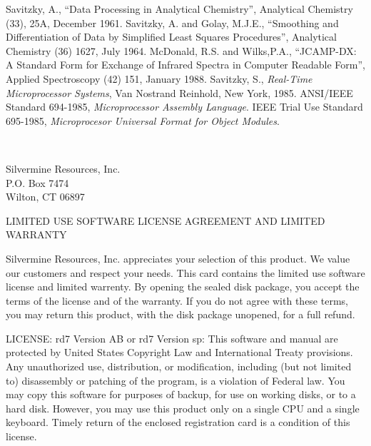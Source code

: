 {\small
\begin{thebibliography}{9}
	Savitzky, A., ``Data Processing in Analytical Chemistry'',
	Analytical Chemistry (33), 25A, December 1961.
	Savitzky, A. and Golay, M.J.E., ``Smoothing and Differentiation
	of Data by Simplified Least Squares Procedures'', Analytical
	Chemistry (36) 1627, July 1964.
	McDonald, R.S. and Wilks,P.A., ``JCAMP-DX: A Standard Form for
	Exchange of Infrared Spectra in Computer Readable Form'', 
	Applied Spectroscopy (42) 151, January 1988.
	Savitzky, S., {\em Real-Time Microprocessor Systems},
	Van Nostrand Reinhold, New York, 1985.
	ANSI/IEEE Standard 694-1985, {\em Microprocessor
	Assembly Language}.
	IEEE Trial Use Standard 695-1985, {\em Microprocesor Universal
	Format for Object Modules}.
\end{thebibliography}
}
\medskip
\noindent\ \hrulefill\ 
\begin{center}
	Silvermine Resources, Inc.	\\
	P.O. Box 7474			\\
	Wilton, CT 06897		\\
\end{center}

 
\newpage
\begin{center}
     LIMITED USE SOFTWARE LICENSE AGREEMENT AND LIMITED WARRANTY
\end{center}

Silvermine Resources, Inc. appreciates your selection of this product.
We value our customers and respect your needs.  This card contains
the limited use software license and limited warrenty.  By opening
the sealed disk package, you accept the terms of the license and of
the warranty.  If you do not agree with these terms, you may return
this product, with the disk package unopened, for a full refund.

LICENSE:  rd7 Version AB or rd7 Version sp:  This software and manual
are protected by United States Copyright Law and International Treaty
provisions.  Any unauthorized use, distribution, or modification,
including (but not limited to) disassembly or patching of the
program, is a violation of Federal law.  You may copy this software for
purposes of backup, for use on working disks, or to a hard disk.
However, you may use this product only on a single CPU and a single
keyboard.  Timely return of the enclosed registration card is a 
condition of this license.  

